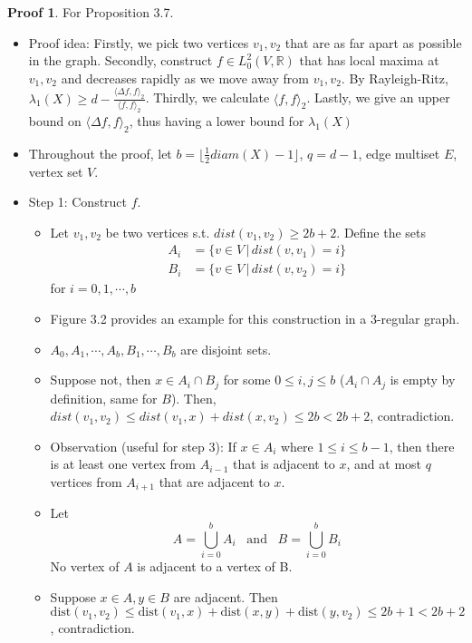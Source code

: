 \documentclass{book}
\newcommand{\R}{\mathbb{R}}
\newcommand{\dist}[1]{\textrm{dist}( #1 )}
\theoremstyle{definition}
\theoremstyle{remarkstyle}
\newtheorem*{myproof}{Proof}%
\begin{document}
\begin{myproof}
    For Proposition 3.7.
    \begin{itemize}
        \item Proof idea: Firstly, we pick two vertices $v_{1}, v_{2} $ that are as far apart as possible in the graph. Secondly, construct $f \in L^{2}_{0}(V, \R) $ that has local maxima at $v_{1}, v_{2} $ and decreases rapidly as we move away from $v_{1}, v_{2} $. By Rayleigh-Ritz, $\lambda_{1}(X) \ge d - \frac{\langle \Delta f, f \rangle_{2} }{\langle f,f \rangle_{2} }  $. Thirdly, we calculate $\langle f,f \rangle_{2} $. Lastly, we give an upper bound on $\langle \Delta f,f \rangle_{2} $, thus having a lower bound for $\lambda_{1}(X) $
        \item Throughout the proof, let $b = \lfloor \frac{1}{2}diam(X)-1 \rfloor $, $q=d-1$, edge multiset $E$, vertex set $V$.
        \item Step 1: Construct $f$. 
        \begin{itemize}
            \item Let $v_{1}, v_{2} $ be two vertices s.t. $dist(v_{1}, v_{2}) \ge 2b + 2 $. Define the sets \begin{align*}
            A_{i} &= \{v \in V \, \rvert \, dist(v,v_{1}) = i \} \\
            B_{i} &= \{v \in V \, \rvert \, dist(v, v_{2}) = i \}
            \end{align*} for $i =0,1,\cdots,b$
            \item Figure 3.2 provides an example for this construction in a 3-regular graph. 
            \item $A_{0}, A_{1}, \cdots, A_{b}, B_{1}, \cdots, B_{b} $ are disjoint sets. 
            \item Suppose not, then $x \in A_{i} \cap B_{j} $ for some $0\le i,j \le b$ ($A_{i} \cap A_{j}$ is empty by definition, same for $B$). Then, $dist(v_{1}, v_{2}) \le dist(v_{1}, x) + dist(x,v_{2}) \le 2b < 2b+2 $, contradiction. 
            \item Observation (useful for step 3): If $x \in A_{i} $ where $1 \le i \le b-1$, then there is at least one vertex from $A_{i-1} $ that is adjacent to $x$, and at most $q$ vertices from $A_{i+1} $ that are adjacent to $x$.
            \item Let $$A = \bigcup^{b}_{i=0}A_{i} \; \; \; \textrm{and} \; \; \; B= \bigcup^{b}_{i=0}B_{i} $$ No vertex of $A$ is adjacent to a vertex of B. 
            \item Suppose $x \in A, y\in B$ are adjacent. Then $\dist{v_{1}, v_{2}} \le \dist{v_{1}, x} + \dist{x,y} + \dist{y,v_{2}} \le 2b+1 < 2b+2 $, contradiction.

\end{itemize}
\end{itemize}
\end{myproof}
\end{document}
